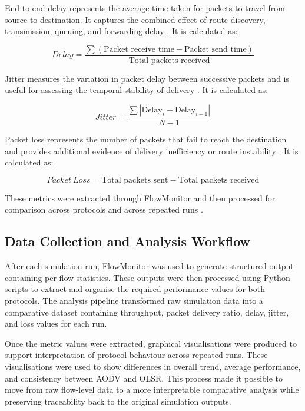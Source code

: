 \documentclass{Academic}
\begin{document}
End-to-end delay represents the average time taken for packets to travel from source to destination. It captures the combined effect of route discovery, transmission, queuing, and forwarding delay \parencite{mohapatra2012,radha2018,sarao2022}. It is calculated as:

\begin{equation}
Delay = \frac{\sum(\text{Packet receive time} - \text{Packet send time})}{\text{Total packets received}}
\end{equation}

Jitter measures the variation in packet delay between successive packets and is useful for assessing the temporal stability of delivery \parencite{carneiro2009flowmonitor,sarao2022,selim2025}. It is calculated as:

\begin{equation}
Jitter = \frac{\sum |\text{Delay}_{i} - \text{Delay}_{i-1}|}{N-1}
\end{equation}

Packet loss represents the number of packets that fail to reach the destination and provides additional evidence of delivery inefficiency or route instability \parencite{mohapatra2012,radha2018,selim2025}. It is calculated as:

\begin{equation}
Packet\ Loss = \text{Total packets sent} - \text{Total packets received}
\end{equation}

These metrics were extracted through FlowMonitor and then processed for comparison across protocols and across repeated runs \parencite{carneiro2009flowmonitor,riley2010ns3,ns3flowmonitordocs}.

\subsection{Data Collection and Analysis Workflow}

After each simulation run, FlowMonitor was used to generate structured output containing per-flow statistics. These outputs were then processed using Python scripts to extract and organise the required performance values for both protocols. The analysis pipeline transformed raw simulation data into a comparative dataset containing throughput, packet delivery ratio, delay, jitter, and loss values for each run.

Once the metric values were extracted, graphical visualisations were produced to support interpretation of protocol behaviour across repeated runs. These visualisations were used to show differences in overall trend, average performance, and consistency between AODV and OLSR. This process made it possible to move from raw flow-level data to a more interpretable comparative analysis while preserving traceability back to the original simulation outputs.
\end{document}
